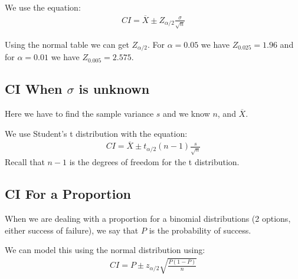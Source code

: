 \documentclass[12pt,letterpaper]{article} \usepackage{amsmath} \usepackage{graphicx} \usepackage[margin=1in]{geometry} \usepackage{longtable}  \usepackage{amssymb}
\begin{document}
	We use the equation:
	\begin{align*}
		CI = \overline X \pm Z_{\alpha/2} \frac{\sigma}{\sqrt n}
	\end{align*}

	Using the normal table we can get $Z_{\alpha/2}$. For $\alpha = 0.05$ we have $Z_{0.025} = 1.96$ and for $\alpha = 0.01$ we have $Z_{0.005} = 2.575$.
	
	\subsection{CI When $\sigma$ is unknown}
	Here we have to find the sample variance $s$ and we know $n$, and $\overline X$.
	
	We use Student's t distribution with the equation:
	\begin{align*}
		CI = \overline X \pm t_{\alpha/2}(n-1) \frac{s}{\sqrt n}
	\end{align*}
	Recall that $n-1$ is the degrees of freedom for the t distribution.
	
	\subsection{CI For a Proportion}
	When we are dealing with a proportion for a binomial distributions (2 options, either success of failure), we say that $P$ is the probability of success. 
	
	We can model this using the normal distribution using:
	\begin{align*}
		CI = P \pm z_{\alpha/2} \sqrt{\frac{P(1-P)}{n}}
	\end{align*}
	
\end{document}
